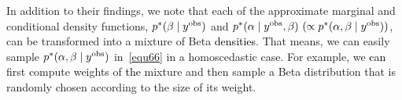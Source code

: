 \documentclass[12pt]{article}
\begin{document}





In addition to their findings, we note that each of the  approximate marginal and conditional  density functions, $\textcolor{black}{p}^\ast(\beta\mid y^{\textrm{obs}})$ and $\textcolor{black}{p}^\ast(\alpha\mid y^{\textrm{obs}}, \beta)~(\propto \textcolor{black}{p}^\ast(\alpha, \beta\mid y^{\textrm{obs}}))$,  can be transformed into a mixture of Beta \textcolor{black}{densities}. That means, we can easily sample $\textcolor{black}{p}^\ast(\alpha, \beta\mid y^{\textrm{obs}})$ in~\eqref{equ66}  in a homoscedastic case. For example, we \textcolor{black}{can} first compute weights of \textcolor{black}{the} mixture and then sample a  Beta distribution that is randomly chosen according to the size of its weight. 
\end{document}
